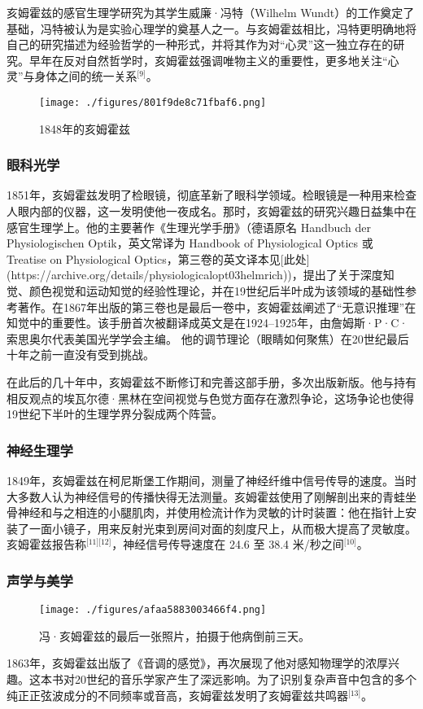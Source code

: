 亥姆霍兹的感官生理学研究为其学生威廉·冯特（Wilhelm Wundt）的工作奠定了基础，冯特被认为是实验心理学的奠基人之一。与亥姆霍兹相比，冯特更明确地将自己的研究描述为经验哲学的一种形式，并将其作为对“心灵”这一独立存在的研究。早年在反对自然哲学时，亥姆霍兹强调唯物主义的重要性，更多地关注“心灵”与身体之间的统一关系\(^\text{[9]}\)。
\begin{figure}[ht]
\centering
\texttt{[image: ./figures/801f9de8c71fbaf6.png]}
\caption{1848年的亥姆霍兹} \label{fig_HEMfhm_2}
\end{figure}
\subsubsection{眼科光学}
1851年，亥姆霍兹发明了检眼镜，彻底革新了眼科学领域。检眼镜是一种用来检查人眼内部的仪器，这一发明使他一夜成名。那时，亥姆霍兹的研究兴趣日益集中在感官生理学上。他的主要著作《生理光学手册》（德语原名 Handbuch der Physiologischen Optik，英文常译为 Handbook of Physiological Optics 或 Treatise on Physiological Optics，第三卷的英文译本见[此处](https://archive.org/details/physiologicalopt03helmrich))，提出了关于深度知觉、颜色视觉和运动知觉的经验性理论，并在19世纪后半叶成为该领域的基础性参考著作。在1867年出版的第三卷也是最后一卷中，亥姆霍兹阐述了“无意识推理”在知觉中的重要性。该手册首次被翻译成英文是在1924–1925年，由詹姆斯·P·C·索思奥尔代表美国光学学会主编。
他的调节理论（眼睛如何聚焦）在20世纪最后十年之前一直没有受到挑战。

在此后的几十年中，亥姆霍兹不断修订和完善这部手册，多次出版新版。他与持有相反观点的埃瓦尔德·黑林在空间视觉与色觉方面存在激烈争论，这场争论也使得19世纪下半叶的生理学界分裂成两个阵营。
\subsubsection{神经生理学}
1849年，亥姆霍兹在柯尼斯堡工作期间，测量了神经纤维中信号传导的速度。当时大多数人认为神经信号的传播快得无法测量。亥姆霍兹使用了刚解剖出来的青蛙坐骨神经和与之相连的小腿肌肉，并使用检流计作为灵敏的计时装置：他在指针上安装了一面小镜子，用来反射光束到房间对面的刻度尺上，从而极大提高了灵敏度。亥姆霍兹报告称\(^\text{[11][12]}\)，神经信号传导速度在 24.6 至 38.4 米/秒之间\(^\text{[10]}\)。
\subsubsection{声学与美学}
\begin{figure}[ht]
\centering
\texttt{[image: ./figures/afaa5883003466f4.png]}
\caption{冯·亥姆霍兹的最后一张照片，拍摄于他病倒前三天。} \label{fig_HEMfhm_4}
\end{figure}
1863年，亥姆霍兹出版了《音调的感觉》，再次展现了他对感知物理学的浓厚兴趣。这本书对20世纪的音乐学家产生了深远影响。为了识别复杂声音中包含的多个纯正正弦波成分的不同频率或音高，亥姆霍兹发明了亥姆霍兹共鸣器\(^\text{[13]}\)。

